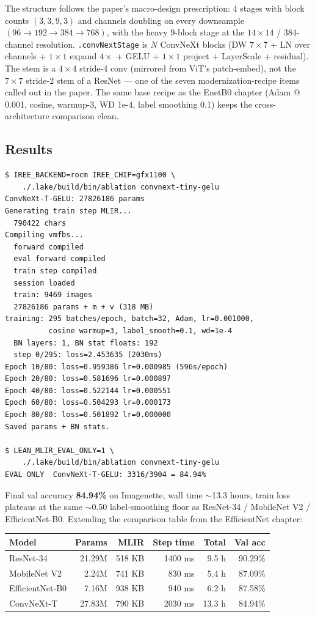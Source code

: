 The structure follows the paper's macro-design prescription:
4 stages with block counts $(3, 3, 9, 3)$ and channels doubling on
every downsample $(96 \to 192 \to 384 \to 768)$, with the heavy
9-block stage at the $14 \times 14$ / 384-channel resolution.
\texttt{.convNextStage} is $N$ ConvNeXt blocks (DW $7\times 7$ +
LN over channels + $1\times 1$ expand $4\times$ + GELU + $1\times 1$
project + LayerScale + residual). The stem is a $4 \times 4$
stride-4 conv (mirrored from ViT's patch-embed), not the
$7 \times 7$ stride-2 stem of a ResNet --- one of the seven
modernization-recipe items called out in the paper. The same base
recipe as the EnetB0 chapter (Adam @ 0.001, cosine, warmup-3,
WD 1e-4, label smoothing 0.1) keeps the cross-architecture
comparison clean.

\subsection*{Results}

\begin{verbatim}
$ IREE_BACKEND=rocm IREE_CHIP=gfx1100 \
    ./.lake/build/bin/ablation convnext-tiny-gelu
ConvNeXt-T-GELU: 27826186 params
Generating train step MLIR...
  790422 chars
Compiling vmfbs...
  forward compiled
  eval forward compiled
  train step compiled
  session loaded
  train: 9469 images
  27826186 params + m + v (318 MB)
training: 295 batches/epoch, batch=32, Adam, lr=0.001000,
          cosine warmup=3, label_smooth=0.1, wd=1e-4
  BN layers: 1, BN stat floats: 192
  step 0/295: loss=2.453635 (2030ms)
Epoch 10/80: loss=0.959386 lr=0.000985 (596s/epoch)
Epoch 20/80: loss=0.581696 lr=0.000897
Epoch 40/80: loss=0.522144 lr=0.000551
Epoch 60/80: loss=0.504293 lr=0.000173
Epoch 80/80: loss=0.501892 lr=0.000000
Saved params + BN stats.

$ LEAN_MLIR_EVAL_ONLY=1 \
    ./.lake/build/bin/ablation convnext-tiny-gelu
EVAL ONLY  ConvNeXt-T-GELU: 3316/3904 = 84.94%
\end{verbatim}

Final val accuracy \textbf{84.94\%} on Imagenette, wall time
$\sim$13.3 hours, train loss plateaus at the same $\sim$0.50
label-smoothing floor as ResNet-34 / MobileNet V2 / EfficientNet-B0.
Extending the comparison table from the EfficientNet chapter:

\begin{center}
\begin{tabular}{l r r r r r}
\hline
Model            & Params  & MLIR     & Step time & Total    & Val acc \\
\hline
ResNet-34        & 21.29M  & 518 KB   & 1400 ms   & 9.5 h    & 90.29\% \\
MobileNet V2     &  2.24M  & 741 KB   &  830 ms   & 5.4 h    & 87.09\% \\
EfficientNet-B0  &  7.16M  & 938 KB   &  940 ms   & 6.2 h    & 87.58\% \\
ConvNeXt-T       & 27.83M  & 790 KB   & 2030 ms   & 13.3 h   & 84.94\% \\
\hline
\end{tabular}
\end{center}

